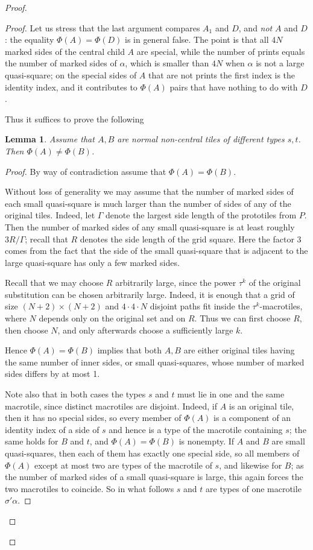 \documentclass[10pt,a4paper]{amsart}
\newtheorem{lemma}{Lemma}
\begin{document}
\begin{proof}
\begin{proof}
Let us stress that the last argument compares $A_1$ and $D$, and \emph{not} $A$ and $D$:
the equality $\Phi(A)=\Phi(D)$ is in general false. The point is that all $4N$ marked sides of the
central child $A$ are special, while the number of prints equals the number of marked sides of
$\alpha$, which is smaller than $4N$ when $\alpha$ is not a large quasi-square; on the special
sides of $A$ that are not prints the first index is the identity index, and it contributes to
$\Phi(A)$ pairs that have nothing to do with $D$.

Thus it suffices to prove the following

\begin{lemma}\label{l8}
Assume that $A,B$ are normal non-central tiles of different types $s,t$. Then $\Phi(A)\ne \Phi(B)$. 
\end{lemma}
\begin{proof}
By way of contradiction assume that $\Phi(A)= \Phi(B)$. 

Without loss of generality we may assume that the number of marked sides of each small quasi-square 
is much larger than the number of sides of any of the original tiles.
Indeed,  let $\Gamma$
denote the largest side length of the prototiles from $P$.
Then the number of marked sides of any small quasi-square is at least roughly $3R/\Gamma$; recall that $R$ denotes
the side length of the grid square. %
Here the factor 3 comes from the fact that 
the side of the small quasi-square that is adjacent to the large quasi-square has only a few marked sides.

Recall that we may choose $R$ arbitrarily large, since
the power $\tau^k$ of the original substitution can be chosen arbitrarily
large. Indeed, it is enough that a grid of size $(N+2)\times (N+2)$ and $4\cdot4\cdot N$ disjoint paths fit inside the
$\tau^k$-macrotiles, where $N$ depends only on the original set and on $R$. Thus
we can first choose $R$, then choose $N$, and only afterwards choose a
sufficiently large $k$.

Hence $\Phi(A)=\Phi(B)$ implies that both $A,B$ are either original tiles having the same number of inner sides,
or small quasi-squares, whose number of marked sides differs by at most 1.

Note also that in both cases the types $s$ and $t$ must lie in one and the same macrotile, since
distinct macrotiles are disjoint. Indeed, if $A$ is an original tile, then it has no special sides,
so every member of $\Phi(A)$ is a component of an identity index of a side of $s$ and hence is a
type of the macrotile containing $s$; the same holds for $B$ and $t$, and $\Phi(A)=\Phi(B)$ is
nonempty. If $A$ and $B$ are small quasi-squares, then each of them has exactly one special side,
so all members of $\Phi(A)$ except at most two are types of the macrotile of $s$, and likewise for
$B$; as the number of marked sides of a small quasi-square is large, this again forces the two
macrotiles to coincide. So in what follows $s$ and $t$ are types of one macrotile $\sigma'\alpha$.


\end{proof}
\end{proof}
\end{proof}
\end{document}
